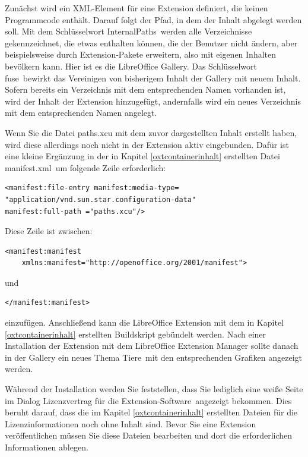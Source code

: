 \documentclass[a4paper,10pt,pagesize,titlepage]{scrbook}
\begin{document}
Zunächst wird ein XML-Element für eine Extension definiert, die keinen Programmcode enthält. Darauf folgt der Pfad, in dem der Inhalt abgelegt werden soll. Mit dem Schlüsselwort \glqq InternalPaths\grqq~werden alle Verzeichnisse gekennzeichnet, die etwas enthalten können, die der Benutzer nicht ändern, aber beispielsweise durch Extension-Pakete erweitern, also mit eigenen Inhalten bevölkern kann. Hier ist es die LibreOffice Gallery. Das Schlüsselwort \glqq fuse\grqq~bewirkt das Vereinigen von bisherigem Inhalt der Gallery mit neuem Inhalt. Sofern bereits ein Verzeichnis mit dem entsprechenden Namen vorhanden ist, wird der Inhalt der Extension hinzugefügt, andernfalls wird ein neues Verzeichnis mit dem entsprechenden Namen angelegt.

Wenn Sie die Datei paths.xcu mit dem zuvor dargestellten Inhalt erstellt haben, wird diese allerdings noch nicht in der Extension aktiv eingebunden. Dafür ist eine kleine Ergänzung in der in Kapitel \ref{oxtcontainerinhalt} erstellten Datei \glqq manifest.xml\grqq~um folgende Zeile erforderlich:
\begin{lstlisting}
<manifest:file-entry manifest:media-type=
"application/vnd.sun.star.configuration-data"  
manifest:full-path ="paths.xcu"/>
\end{lstlisting}  
Diese Zeile ist zwischen:
\begin{lstlisting}
<manifest:manifest 
    xmlns:manifest="http://openoffice.org/2001/manifest">
\end{lstlisting}

und

\begin{lstlisting}
</manifest:manifest>
\end{lstlisting}
einzufügen. Anschließend kann die LibreOffice Extension mit dem in Kapitel \ref{oxtcontainerinhalt} erstellten Buildskript gebündelt werden. Nach einer Installation der Extension mit dem LibreOffice Extension Manager sollte danach in der Gallery ein neues Thema \glqq Tiere\grqq~mit den entsprechenden Grafiken angezeigt werden.

Während der Installation werden Sie feststellen, dass Sie lediglich eine weiße Seite im Dialog \glqq Lizenzvertrag für die Extension-Software\grqq~angezeigt bekommen. Dies beruht darauf, dass die im Kapitel \ref{oxtcontainerinhalt} erstellten Dateien für die Lizenzinformationen noch ohne Inhalt sind. Bevor Sie eine Extension veröffentlichen müssen Sie diese Dateien bearbeiten und dort die erforderlichen Informationen ablegen.
\end{document}
